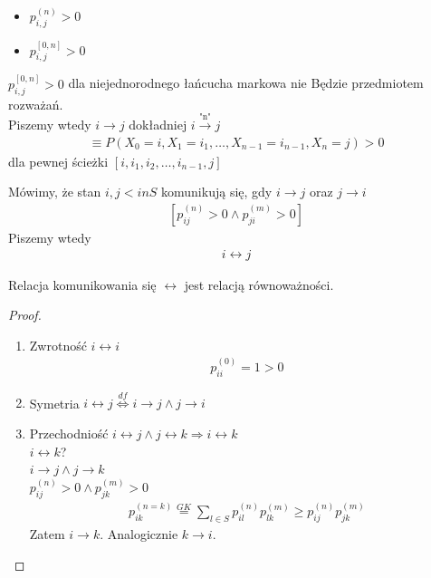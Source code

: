 \begin{itemize}
\item $ p_{i,j}^{(n)}>0 $
\item $ p_{i,j}^{[0,n]}>0 $
\end{itemize}
$ p_{i,j}^{[0,n]}>0 $ dla niejednorodnego łańcucha markowa nie Będzie przedmiotem rozważań.\\
Piszemy wtedy $ i\longrightarrow j $ dokładniej $ i\xrightarrow{\text{"n"}}j $
\begin{gather*}
\equiv P\left(X_0=i,X_1=i_1,\dots,X_{n-1}=i_{n-1},X_n=j\right)>0
\end{gather*}
dla pewnej ścieżki $ \left[i,i_1,i_2,\dots,i_{n-1},j\right] $
\begin{defi}
Mówimy, że stan $ i,j<in S $ komunikują się, gdy $ i\longrightarrow j $ oraz $ j\longrightarrow i $
\begin{gather*}
\left[
p_{ij}^{(n)}>0\wedge
p_{ji}^{(m)}>0
\right]
\end{gather*}
Piszemy wtedy
\begin{gather*}
i\longleftrightarrow j
\end{gather*}
\end{defi}
\begin{twr}
Relacja komunikowania się $ \longleftrightarrow $ jest relacją równoważności.
\begin{proof}
\begin{enumerate}
\item Zwrotność $ i\longleftrightarrow i $
\begin{gather*}
p_{ii}^{(0)}=1>0
\end{gather*}
\item Symetria $ i\longleftrightarrow j\stackrel{df}{\Leftrightarrow}i\longrightarrow j\wedge j\longrightarrow i $
\item Przechodniość $ i\longleftrightarrow j \wedge j\longleftrightarrow k\Rightarrow i\longleftrightarrow k$\\
$ i\longleftrightarrow k $?\\
$ i\longrightarrow j\wedge j\longrightarrow k $\\
$ p_{ij}^{(n)}>0 \wedge p_{jk}^{(m)}>0 $
\begin{gather*}
p_{ik}^{(n=k)}\stackrel{GK}{=}\sum_{l\in S}p_{il}^{(n)}p_{lk}^{(m)}\ge p_{ij}^{(n)}p_{jk}^{(m)}
\end{gather*}
Zatem $ i\longrightarrow k $. Analogicznie $ k\longrightarrow i $.
\end{enumerate}
\end{proof}
\end{twr}
